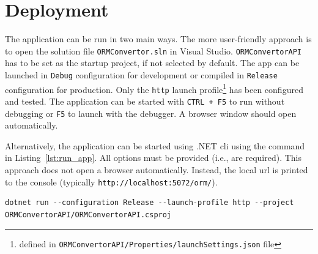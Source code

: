 
\section{Deployment}
The application can be run in two main ways. The more user-friendly approach is to open the solution file \texttt{ORMConvertor.sln} in Visual Studio. \texttt{ORMConvertorAPI} has to be set as the startup project, if not selected by default. The app can be launched in \texttt{Debug} configuration for development or compiled in \texttt{Release} configuration for production. Only the \texttt{http} launch profile\footnote{defined in \texttt{ORMConvertorAPI/Properties/launchSettings.json} file} has been configured and tested. The application can be started with \texttt{CTRL + F5} to run without debugging or \texttt{F5} to launch with the debugger. A browser window should open automatically.

Alternatively, the application can be started using .NET \acrshort{cli} using the command in Listing~\ref{lst:run_app}. All options must be provided (i.e., are required). This approach does not open a browser automatically. Instead, the local \acrshort{url} is printed to the console (typically \texttt{http://localhost:5072/orm/}).
\begin{lstlisting}[numbers=none,caption=Application launch command,label=lst:run_app]
dotnet run --configuration Release --launch-profile http --project ORMConvertorAPI/ORMConvertorAPI.csproj
\end{lstlisting}

